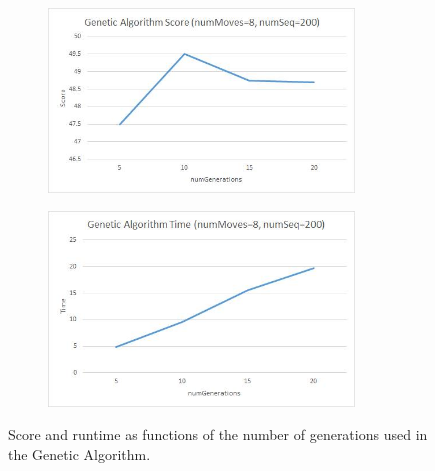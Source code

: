 \documentclass[10pt, final]{article}
\begin{document}
\begin{figure}[h]
\begin{center}
\begin{subfigure}[h]{3.2in}
\includegraphics[width=3.2in]{geneticScore.jpg}
\end{subfigure}
\begin{subfigure}[h]{3.2in}
\includegraphics[width=3.2in]{geneticTime.jpg}
\end{subfigure}
\caption{Score and runtime as functions of the number of generations used in the Genetic Algorithm.}
\label{fig:genetics}
\end{center}
\end{figure}

\newpage
\end{document}

